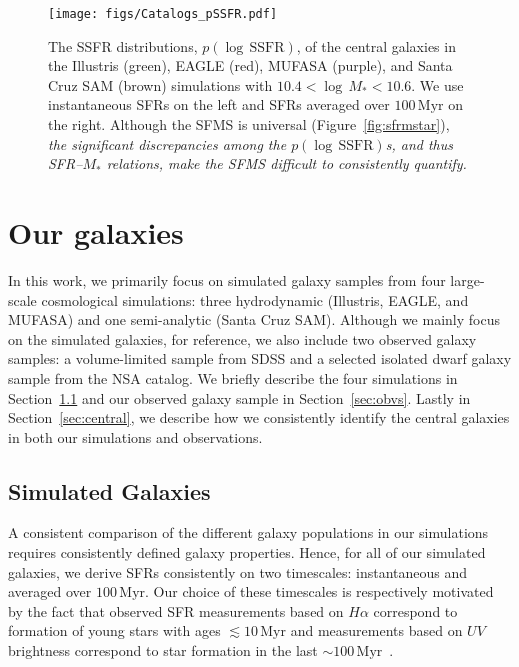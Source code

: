 \documentclass[preprint2,tighten]{aastex62}
\begin{document}
\begin{figure}
\begin{center}
\texttt{[image: figs/Catalogs\_pSSFR.pdf]} 
\caption{The SSFR distributions, $p(\log\,\mathrm{SSFR})$, of the 
central galaxies in the Illustris (green), 
EAGLE (red),  MUFASA (purple), and  Santa Cruz SAM (brown) simulations 
with $10.4 < \log\,M_* < 10.6$. We use instantaneous SFRs on the left
and SFRs averaged over $100\,\mathrm{Myr}$ on the right. Although the
SFMS is universal (Figure~\ref{fig:sfrmstar}), 
\emph{the significant discrepancies among the $p(\log\,\mathrm{SSFR})$s,
and thus SFR--$M_*$ relations, make the SFMS difficult to consistently 
quantify.}} \label{fig:pssfr}
\end{center}
\end{figure}

\section{Our galaxies} \label{sec:ourgals}
In this work, we primarily focus on simulated galaxy samples from four 
large-scale cosmological simulations: three hydrodynamic (Illustris, EAGLE, 
and MUFASA) and one semi-analytic (Santa Cruz SAM). Although we mainly 
focus on the simulated galaxies, for reference, we also include two observed 
galaxy samples: a volume-limited sample from SDSS and a selected isolated 
dwarf galaxy sample from the NSA catalog. We briefly describe the four 
simulations in Section~\ref{sec:galsims} and our observed galaxy sample 
in Section~\ref{sec:obvs}. %
Lastly in Section~\ref{sec:central}, we describe how we consistently 
identify the central galaxies in both our simulations and observations. 

\subsection{Simulated Galaxies} \label{sec:galsims}
A consistent comparison of the different galaxy populations in our 
simulations requires consistently defined galaxy properties. Hence, 
for all of our simulated galaxies, we derive SFRs consistently on 
two timescales: instantaneous and averaged over $100\,\mathrm{Myr}$. 
Our choice of these timescales is respectively motivated by the fact 
that observed SFR measurements based on $H{\alpha}$ correspond to 
formation of young stars with ages $\lesssim 10\,\mathrm{Myr}$ and 
measurements based on $UV$ brightness correspond to star formation 
in the last $\sim 100\,\mathrm{Myr}$~\citep[e.g.][]{kennicutt2012}. 
\end{document}
